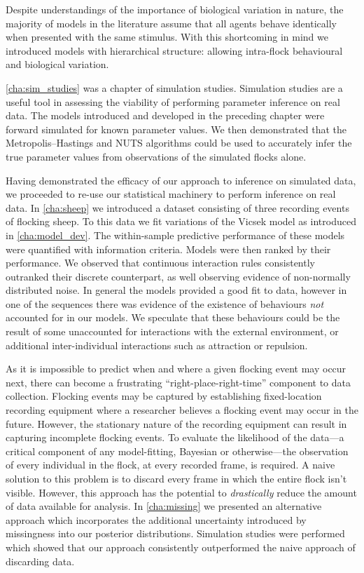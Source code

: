 Despite understandings of the importance of biological variation in nature, the
majority of models in the literature assume that all agents behave identically
when presented with the same stimulus. With this shortcoming in mind we
introduced models with hierarchical structure: allowing intra-flock behavioural
and biological variation.

\cref{cha:sim_studies} was a chapter of simulation studies. Simulation studies
are a useful tool in assessing the viability of performing parameter inference
on real data. The models introduced and developed in the preceding chapter
were forward simulated for known parameter values. We then demonstrated that
the Metropolis--Hastings and NUTS algorithms could be used to accurately infer
the true parameter values from observations of the simulated flocks alone.

Having demonstrated the efficacy of our approach to inference on simulated
data, we proceeded to re-use our statistical machinery to perform inference on
real data. In \cref{cha:sheep} we introduced a dataset consisting of three
recording events of flocking sheep. To this data we fit variations of the
Vicsek model as introduced in \cref{cha:model_dev}. The within-sample
predictive performance of these models were quantified with information
criteria. Models were then ranked by their performance. We observed that
continuous interaction rules consistently outranked their discrete counterpart,
as well observing evidence of non-normally distributed noise. In general the
models provided a good fit to data, however in one of the sequences there was
evidence of the existence of behaviours \emph{not} accounted for in our models.
We speculate that these behaviours could be the result of some unaccounted for
interactions with the external environment, or additional inter-individual
interactions such as attraction or repulsion.

As it is impossible to predict when and where a given flocking event may occur
next, there can become a frustrating ``right-place-right-time'' component to
data collection. Flocking events may be captured by establishing fixed-location
recording equipment where a researcher believes a flocking event may occur in
the future. However, the stationary nature of the recording equipment can
result in capturing incomplete flocking events. To evaluate the likelihood of
the data---a critical component of any model-fitting, Bayesian or
otherwise---the observation of every individual in the flock, at every recorded
frame, is required. A naive solution to this problem is to discard every frame
in which the entire flock isn't visible. However, this approach has the
potential to \emph{drastically} reduce the amount of data available for
analysis. In \cref{cha:missing} we presented an alternative approach which
incorporates the additional uncertainty introduced by missingness into our
posterior distributions. Simulation studies were performed which showed that
our approach consistently outperformed the naive approach of discarding data.


